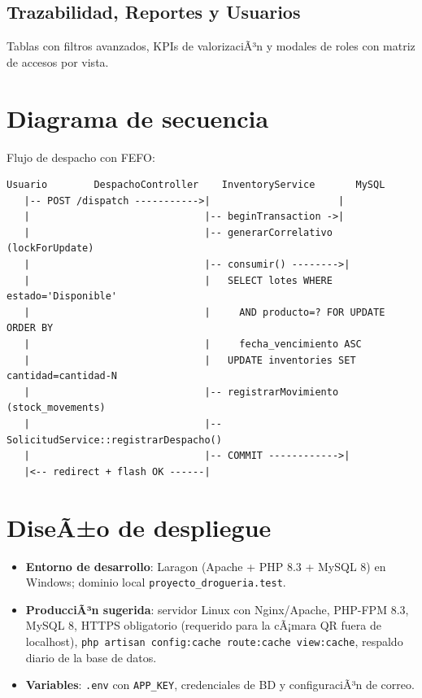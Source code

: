 ﻿\documentclass[a4paper, 12pt]{article}
\begin{document}
\subsection{Trazabilidad, Reportes y Usuarios}
Tablas con filtros avanzados, KPIs de valorizaciÃ³n y modales de roles con matriz de accesos por vista.

\section{Diagrama de secuencia}
Flujo de despacho con FEFO:

\begin{lstlisting}
Usuario        DespachoController    InventoryService       MySQL
   |-- POST /dispatch ----------->|                      |
   |                              |-- beginTransaction ->|
   |                              |-- generarCorrelativo (lockForUpdate)
   |                              |-- consumir() -------->|
   |                              |   SELECT lotes WHERE estado='Disponible'
   |                              |     AND producto=? FOR UPDATE ORDER BY
   |                              |     fecha_vencimiento ASC
   |                              |   UPDATE inventories SET cantidad=cantidad-N
   |                              |-- registrarMovimiento (stock_movements)
   |                              |-- SolicitudService::registrarDespacho()
   |                              |-- COMMIT ------------>|
   |<-- redirect + flash OK ------|
\end{lstlisting}

\section{DiseÃ±o de despliegue}
\begin{itemize}
    \item \textbf{Entorno de desarrollo}: Laragon (Apache + PHP 8.3 + MySQL 8) en Windows; dominio local \texttt{proyecto\_drogueria.test}.
    \item \textbf{ProducciÃ³n sugerida}: servidor Linux con Nginx/Apache, PHP-FPM 8.3, MySQL 8, HTTPS obligatorio (requerido para la cÃ¡mara QR fuera de localhost), \texttt{php artisan config:cache route:cache view:cache}, respaldo diario de la base de datos.
    \item \textbf{Variables}: \texttt{.env} con \texttt{APP\_KEY}, credenciales de BD y configuraciÃ³n de correo.
\end{itemize}
\end{document}
